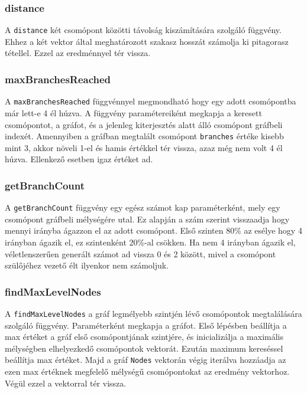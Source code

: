 \subsubsection{distance}

A \texttt{distance} két csomópont közötti távolság kiszámítására szolgáló függvény. Ehhez a két vektor által meghatározott szakasz hosszát számolja ki pitagorasz tétellel. Ezzel az eredménnyel tér vissza.

\subsubsection{maxBranchesReached}

A \texttt{maxBranchesReached} függvénnyel megmondható hogy egy adott csomópontba már lett-e 4 él húzva. A függvény paramétereiként megkapja a keresett csomópontot, a gráfot, és a jelenleg kiterjesztés alatt álló csomópont gráfbeli indexét. Amennyiben a gráfban megtalált csomópont \texttt{branches} értéke kisebb mint 3, akkor növeli 1-el és hamis értékkel tér vissza, azaz még nem volt 4 él húzva. Ellenkező esetben igaz értéket ad.

\subsubsection{getBranchCount}

A \texttt{getBranchCount} függvény egy egész számot kap paraméterként, mely egy csomópont gráfbeli mélységére utal. Ez alapján a szám szerint visszaadja hogy mennyi irányba ágazzon el az adott csomópont. Első szinten 80\% az esélye hogy 4 irányban ágazik el, ez szintenként 20\%-al csökken. Ha nem 4 irányban ágazik el, véletlenszerűen generált számot ad vissza 0 és 2 között, mivel a csomópont szülőjéhez vezető élt ilyenkor nem számoljuk.

\subsubsection{findMaxLevelNodes}

A \texttt{findMaxLevelNodes} a gráf legmélyebb szintjén lévő csomópontok megtalálására szolgáló függvény. Paraméterként megkapja a gráfot. Első lépésben beállítja a max értéket a gráf első csomópontjának szintjére, és inicializálja a maximális mélységben elhelyezkedő csomópontok vektorát. Ezután maximum kereséssel beállítja max értéket. Majd a gráf \texttt{Nodes} vektorán végig iterálva hozzáadja az ezen max értéknek megfelelő mélységű csomópontokat az eredmény vektorhoz. Végül ezzel a vektorral tér vissza.


